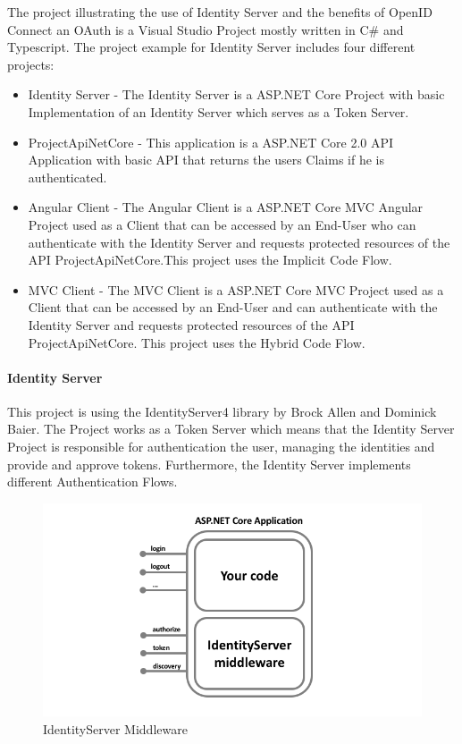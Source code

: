 The project illustrating the use of Identity Server and the benefits of OpenID Connect an OAuth is a Visual Studio Project mostly written in C\# and Typescript. The project example for Identity Server includes four different projects:

\begin{itemize}
	\item Identity Server - The Identity Server is a ASP.NET Core Project with basic Implementation of an Identity Server which serves as a Token Server. 
	\item ProjectApiNetCore - This application is a ASP.NET Core 2.0 API Application with basic API that returns the users Claims if he is authenticated.
	\item Angular Client - The Angular Client is a ASP.NET Core MVC Angular Project used as a Client that can be accessed by an End-User who can authenticate with the Identity Server and requests protected resources of the API ProjectApiNetCore.This project uses the Implicit Code Flow. 
	\item MVC Client - The MVC Client is a ASP.NET Core MVC Project used as a Client that can be accessed by an End-User and can authenticate with the Identity Server and requests protected resources of the API ProjectApiNetCore. This project uses the Hybrid Code Flow. 
\end{itemize}



\paragraph{Identity Server}

This project is using the IdentityServer4 library by Brock Allen and Dominick Baier. The Project works as a Token Server which means that the Identity Server Project is responsible for authentication the user, managing the identities and provide and approve tokens. Furthermore, the Identity Server implements different Authentication Flows.


\begin{figure}[h]
	\centering
	\includegraphics[width=0.8\linewidth]{images/middlewareIdentityServer}
	\caption{IdentityServer Middleware}
	\label{fig:middlewareidentityserver}
\end{figure}
 

